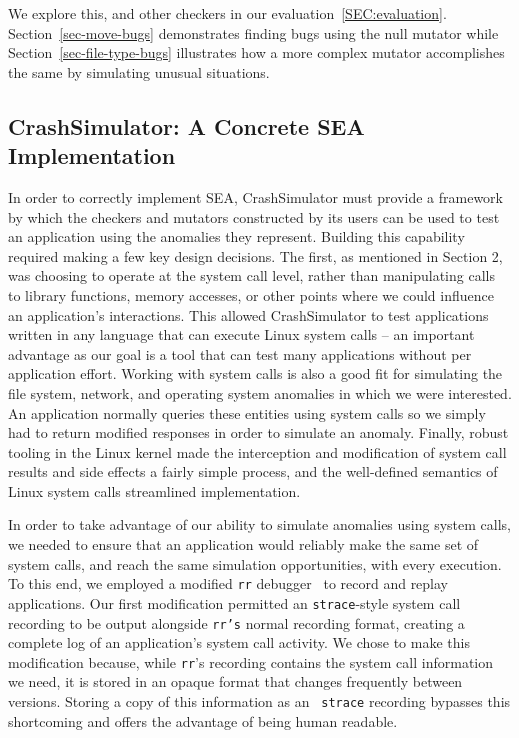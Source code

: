 We explore this, and other checkers in our evaluation~\ref{SEC:evaluation}.
Section~\ref{sec-move-bugs} demonstrates finding bugs using the null
mutator while Section~\ref{sec-file-type-bugs}
illustrates how a more complex
mutator accomplishes the same by simulating unusual situations.


\subsection{CrashSimulator: A Concrete SEA Implementation}
\label{SUBSEC:ApproachCrashSim}

In order to correctly implement SEA, CrashSimulator
must provide a framework
by which the checkers and mutators
constructed by its users can be used to
test an application using the anomalies they represent.
Building this capability
required making a few key design decisions. The first, as mentioned in
Section 2, was choosing to operate at the system call level, rather than
manipulating calls to library functions, memory accesses, or other points
where we could influence an application’s interactions.
This allowed CrashSimulator
to test applications written in any
language that can execute Linux system
calls -- an important advantage as our
goal is a tool that can test many
applications without per application
effort.
Working with system calls is also a good fit
for simulating the file system,
network, and operating system anomalies in which we were interested.
An application normally queries these entities using system calls
so we simply had to return modified responses in order to simulate an
anomaly.
Finally, robust tooling in the Linux kernel made the
interception and modification of system call results and side effects a
fairly simple process,  and the well-defined semantics of Linux
system calls streamlined implementation.


In order to take advantage of our ability to simulate anomalies using
system calls, we needed to ensure that an application would reliably make
the same set of
system calls, and reach the same simulation opportunities,
with every execution.
To this end,
we employed a modified
{\tt rr} debugger~\cite{rrwebsite} to record and replay applications. Our
first modification permitted an {\tt strace}-style system call recording
to be output alongside {\tt rr's} normal recording format,
creating a complete log of an application’s system call activity.
We chose to make this
modification because, while {\tt rr}'s recording contains the system call
information we need, it is stored in an opaque format that changes
frequently between versions.  Storing a copy of this information as an {\tt
strace} recording bypasses this shortcoming and offers the advantage of
being human readable.

